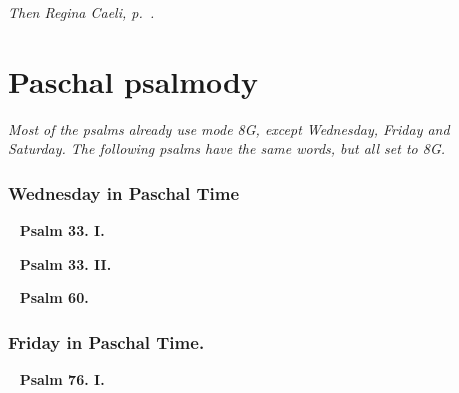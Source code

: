 \documentclass[a5paper,12pt,twoside,openany,oldfontcommands]{memoir}
\newcounter{versecount}
\def\startParallel{}
\def\stopParallel{}
\let\oldtextbf\textbf
\newcommand\rubrics[1]{\textit{#1}}
\newcommand\psalm[1]{~ \hfill \oldtextbf{Psalm #1.} \hfill ~}
\begin{document}
\rubrics{Then Regina Caeli, p.~\pageref{reginacaeli}.}

\chapter{Paschal psalmody}

\rubrics{Most of the psalms already use mode 8G, except Wednesday, Friday and Saturday.  The following psalms have the same words, but all set to 8G.}

\subsection{Wednesday in Paschal Time}
\label{wed-pt}



\psalm{33. I}


\setcounter{versecount}{1}
\startParallel

\stopParallel


\psalm{33. II}


\setcounter{versecount}{1}
\startParallel

\stopParallel


\psalm{60}


\setcounter{versecount}{1}
\startParallel

\stopParallel




\subsection{Friday in Paschal Time.}
\label{fri-pt}


\psalm{76. I}


\setcounter{versecount}{1}
\startParallel

\stopParallel
\end{document}
